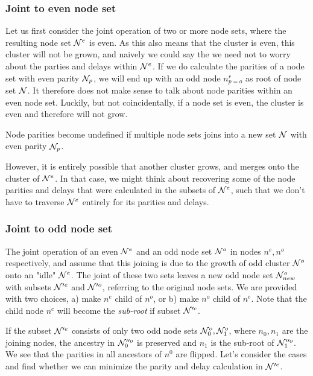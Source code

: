 \subsubsection{Joint to even node set}

Let us first consider the joint operation of two or more node sets, where the resulting node set $\mathcal{N}^{e}$ is even. As this also means that the cluster is even, this cluster will not be grown, and naively we could say the we need not to worry about the parties and delays within $\mathcal{N}^{e}$. If we do calculate the parities of a node set with even parity $\mathcal{N}_p$, we will end up with an odd node $n^r_{p=o}$ as root of node set $\mathcal{N}$. It therefore does not make sense to talk about node parities within an even node set. Luckily, but not coincidentally, if a node set is even, the cluster is even and therefore will not grow.

\begin{lemma}\label{lem:nodecalc_even}
  Node parities become undefined if multiple node sets joins into a new set $\mathcal{N}$ with even parity $\mathcal{N}_p$.
\end{lemma}

However, it is entirely possible that another cluster grows, and merges onto the cluster of $\mathcal{N}^{e}$. In that case, we might think about recovering some of the node parities and delays that were calculated in the subsets of $\mathcal{N}^e$, such that we don't have to traverse $\mathcal{N}^{e}$ entirely for its parities and delays.

\subsubsection{Joint to odd node set}

The joint operation of an even $\mathcal{N}^e$ and an odd node set $\mathcal{N}^o$ in nodes $n^e, n^o$ respectively, and assume that this joining is due to the growth of odd cluster $\mathcal{N}^o$ onto an "idle" $\mathcal{N}^e$. The joint of these two sets leaves a new odd node set $\mathcal{N}_{new}^o$ with subsets $\mathcal{N}'^e$ and $\mathcal{N}'^o$, referring to the original node sets. We are provided with two choices, a) make $n^e$ child of $n^o$, or b) make $n^o$ child of $n^e$. Note that the child node $n^c$ will become the \emph{sub-root} if subset $\mathcal{N}'^c$.

If the subset $\mathcal{N}'^e$ consists of only two odd node sets $\mathcal{N}^o_0, \mathcal{N}^o_1$, where $n_0, n_1$ are the joining nodes, the ancestry in $\mathcal{N}''^o_0$ is preserved and $n_1$ is the sub-root of $\mathcal{N}''^o_1$. We see that the parities in all ancestors of $n^0$ are flipped. Let's consider the cases and find whether we can minimize the parity and delay calculation in $\mathcal{N}'^{e}$. 

